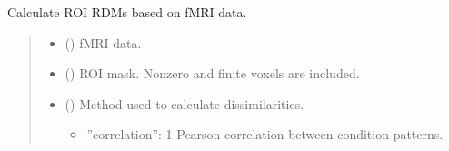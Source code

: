 \documentclass[letterpaper,10pt,english]{sphinxhowto}
\begin{document}

\begin{fulllineitems}
\label{\detokenize{rdm_cal:neurora.rdm_cal.fmriRDM_roi}}
\pysigstartsignatures
{}
\pysigstopsignatures
\sphinxAtStartPar
Calculate ROI RDMs based on fMRI data.
\begin{quote}\begin{description}
\begin{itemize}
\item {} 
\sphinxAtStartPar
{} (\sphinxstyleliteralemphasis{\sphinxupquote{, }}\sphinxstyleliteralemphasis{\sphinxupquote{ {[}}}\sphinxstyleliteralemphasis{\sphinxupquote{, }}\sphinxstyleliteralemphasis{\sphinxupquote{, }}\sphinxstyleliteralemphasis{\sphinxupquote{, }}\sphinxstyleliteralemphasis{\sphinxupquote{, }}\sphinxstyleliteralemphasis{\sphinxupquote{{]}}}) \textendash{} fMRI data.

\item {} 
\sphinxAtStartPar
{} (\sphinxstyleliteralemphasis{\sphinxupquote{, }}\sphinxstyleliteralemphasis{\sphinxupquote{ {[}}}\sphinxstyleliteralemphasis{\sphinxupquote{, }}\sphinxstyleliteralemphasis{\sphinxupquote{, }}\sphinxstyleliteralemphasis{\sphinxupquote{{]}}}) \textendash{} ROI mask. Non\sphinxhyphen{}zero and finite voxels are included.

\item {} 
\sphinxAtStartPar
{} (\sphinxstyleliteralemphasis{\sphinxupquote{, }}\sphinxstyleliteralemphasis{\sphinxupquote{, }}) \textendash{} 
\sphinxAtStartPar
Method used to calculate dissimilarities.
\begin{itemize}
\item {} 
\sphinxAtStartPar
”correlation”: 1 \sphinxhyphen{} Pearson correlation between condition patterns.


\end{itemize}
\end{itemize}
\end{description}
\end{quote}
\end{fulllineitems}
\end{document}
